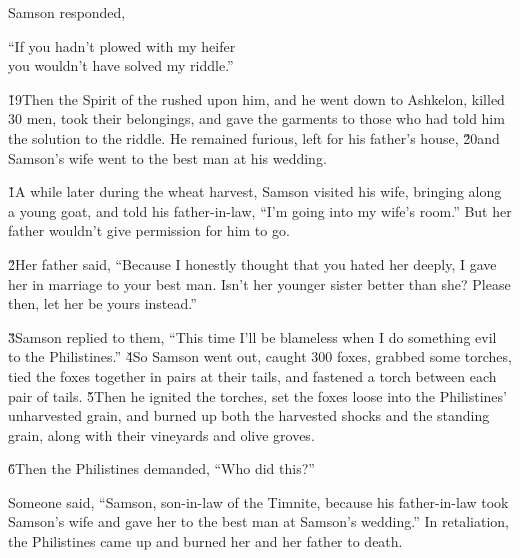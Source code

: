 Samson responded,

\begin{poetry}
\poeml ``If you hadn't plowed with my heifer \\
\poemll    you wouldn't have solved my riddle.''
\end{poetry}

\v{19}Then the Spirit of the  rushed upon him, and he went down to Ashkelon, killed 30 men, took their belongings, and gave the garments to those who had told him the solution to the riddle. He remained furious, left for his father's house, \v{20}and Samson's wife went to the best man at his wedding.

\v{1}A while later during the wheat harvest, Samson visited his wife, bringing along a young goat, and told his father-in-law, ``I'm going into my wife's room.'' But her father wouldn't give permission for him to go.

\v{2}Her father said, ``Because I honestly thought that you hated her deeply, I gave her in marriage to your best man. Isn't her younger sister better than she? Please then, let her be yours instead.''

\v{3}Samson replied to them, ``This time I'll be blameless when I do something evil to the Philistines.'' \v{4}So Samson went out, caught 300 foxes, grabbed some torches, tied the foxes together in pairs at their tails, and fastened a torch between each pair of tails. \v{5}Then he ignited the torches, set the foxes loose into the Philistines' unharvested grain, and burned up both the harvested shocks and the standing grain, along with their vineyards and olive groves.

\v{6}Then the Philistines demanded, ``Who did this?''

Someone said, ``Samson, son-in-law of the Timnite, because his father-in-law took Samson's wife and gave her to the best man at Samson's wedding.'' In retaliation, the Philistines came up and burned her and her father to death.

